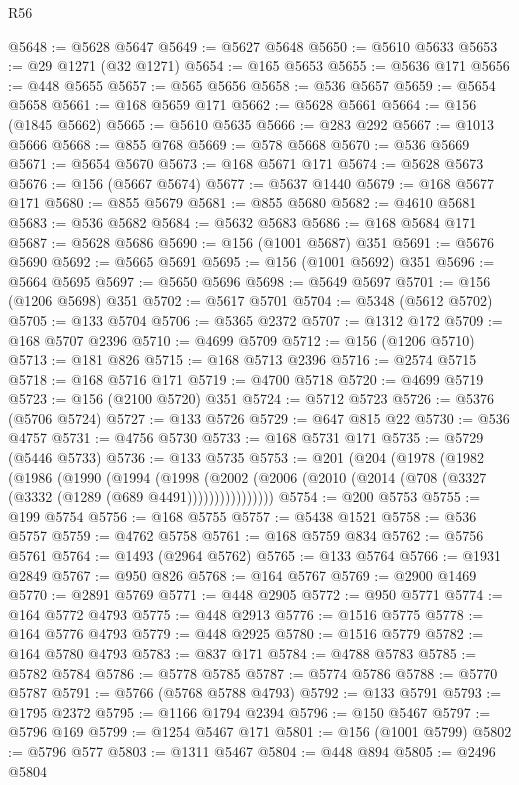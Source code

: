 \begin{lexlean}{R56}
\begin{coremodule}
{{{{{{{{{{{{{{{{{{{{{{{{{{{{{{{{{{{{{{{{{{{{{{{{{{{{{{{{{{{{{{{{{{{{{{{{{{{{{{{{{{{{{{{{{{{{{{{{{{{{{{{{{{{{{{{{{{{{{{{{{{{{{{{{{{{{{{{{{{{{{{{{{{{{{{{{{{{{{{{{{{{{{{{{{{{{{{{{{{{{{{{{{{{{{{{{{{{{{{{{{{{{{{{{{{{@5648 := @5628 @5647
@5649 := @5627 @5648
@5650 := @5610 @5633
@5653 := @29 @1271 (@32 @1271)
@5654 := @165 @5653
@5655 := @5636 @171
@5656 := @448 @5655
@5657 := @565 @5656
@5658 := @536 @5657
@5659 := @5654 @5658
@5661 := @168 @5659 @171
@5662 := @5628 @5661
@5664 := @156 (@1845 @5662)
@5665 := @5610 @5635
@5666 := @283 @292
@5667 := @1013 @5666
@5668 := @855 @768
@5669 := @578 @5668
@5670 := @536 @5669
@5671 := @5654 @5670
@5673 := @168 @5671 @171
@5674 := @5628 @5673
@5676 := @156 (@5667 @5674)
@5677 := @5637 @1440
@5679 := @168 @5677 @171
@5680 := @855 @5679
@5681 := @855 @5680
@5682 := @4610 @5681
@5683 := @536 @5682
@5684 := @5632 @5683
@5686 := @168 @5684 @171
@5687 := @5628 @5686
@5690 := @156 (@1001 @5687) @351
@5691 := @5676 @5690
@5692 := @5665 @5691
@5695 := @156 (@1001 @5692) @351
@5696 := @5664 @5695
@5697 := @5650 @5696
@5698 := @5649 @5697
@5701 := @156 (@1206 @5698) @351
@5702 := @5617 @5701
@5704 := @5348 (@5612 @5702)
@5705 := @133 @5704
@5706 := @5365 @2372
@5707 := @1312 @172
@5709 := @168 @5707 @2396
@5710 := @4699 @5709
@5712 := @156 (@1206 @5710)
@5713 := @181 @826
@5715 := @168 @5713 @2396
@5716 := @2574 @5715
@5718 := @168 @5716 @171
@5719 := @4700 @5718
@5720 := @4699 @5719
@5723 := @156 (@2100 @5720) @351
@5724 := @5712 @5723
@5726 := @5376 (@5706 @5724)
@5727 := @133 @5726
@5729 := @647 @815 @22
@5730 := @536 @4757
@5731 := @4756 @5730
@5733 := @168 @5731 @171
@5735 := @5729 (@5446 @5733)
@5736 := @133 @5735
@5753 := @201
    (@204
      (@1978
        (@1982
          (@1986
            (@1990
              (@1994
                (@1998
                  (@2002 (@2006 (@2010 (@2014 (@708 (@3327 (@3332 (@1289 (@689 @4491))))))))))))))))
@5754 := @200 @5753
@5755 := @199 @5754
@5756 := @168 @5755
@5757 := @5438 @1521
@5758 := @536 @5757
@5759 := @4762 @5758
@5761 := @168 @5759 @834
@5762 := @5756 @5761
@5764 := @1493 (@2964 @5762)
@5765 := @133 @5764
@5766 := @1931 @2849
@5767 := @950 @826
@5768 := @164 @5767
@5769 := @2900 @1469
@5770 := @2891 @5769
@5771 := @448 @2905
@5772 := @950 @5771
@5774 := @164 @5772 @4793
@5775 := @448 @2913
@5776 := @1516 @5775
@5778 := @164 @5776 @4793
@5779 := @448 @2925
@5780 := @1516 @5779
@5782 := @164 @5780 @4793
@5783 := @837 @171
@5784 := @4788 @5783
@5785 := @5782 @5784
@5786 := @5778 @5785
@5787 := @5774 @5786
@5788 := @5770 @5787
@5791 := @5766 (@5768 @5788 @4793)
@5792 := @133 @5791
@5793 := @1795 @2372
@5795 := @1166 @1794 @2394
@5796 := @150 @5467
@5797 := @5796 @169
@5799 := @1254 @5467 @171
@5801 := @156 (@1001 @5799)
@5802 := @5796 @577
@5803 := @1311 @5467
@5804 := @448 @894
@5805 := @2496 @5804
}}}}}}}}}}}}}}}}}}}}}}}}}}}}}}}}}}}}}}}}}}}}}}}}}}}}}}}}}}}}}}}}}}}}}}}}}}}}}}}}}}}}}}}}}}}}}}}}}}}}}}}}}}}}}}}}}}}}}}}}}}}}}}}}}}}}}}}}}}}}}}}}}}}}}}}}}}}}}}}}}}}}}}}}}}}}}}}}}}}}}}}}}}}}}}}}}}}}}}}}}}}}}}}}}}}
\end{coremodule}
\end{lexlean}
